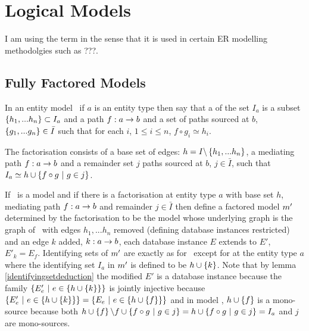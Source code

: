 \section{Logical Models}
I am using the term  in the sense that it is used in certain ER modelling methodolgies such as ???.
\subsection{Fully Factored Models}

\begin{definition}
In an entity model \genericmodel\ if $a$ is an entity type then say that
a  of the set $I_a$ is a subset $\left\{h_1,...h_n\right\} \subset I_a$
and a  path $f:a \rightarrow b$ and a set of paths sourced at $b$, $\left\{g_1,...g_n\right\} \in \bar{I}$
such that for each $i$, $1 \leq i \leq n$, $f \circ g_i \simeq h_i$. 
\end{definition}

The factorisation consists  
of a base set of edges: $h=I \backslash \left\{h_1,...h_n\right\}$, a mediating path $f:a \rightarrow b$ and a remainder 
set $j$ paths sourced at $b$, $j \in \bar{I}$, 
such that $I_a \simeq h \cup \left\{f\circ g \ \middle|\ g \in j\right\}$.

\begin{definition}
If \genericmodel\ is a model and if there is a factorisation at entity type $a$ with
base set $h$, mediating path $f: a \rightarrow b$ and remainder $j \in \bar{I}$ then define
a factored model ${m}'$ determined by the factorisation to be the model
whose underlying graph is the graph of \genericmodel\ with edges $h_1,...h_n$ removed 
(defining database instances restricted) and
an edge $k$ added, $k:a \rightarrow b$, each database instance $E$ extends to $E'$, $E'_k = E_f$.
Identifying sets of ${m}'$ are exactly as for \genericmodel\ except for at the entity
type $a$ where the identifying set $I_a$ in ${m}'$ is defined to be $h \cup \left\{k\right\}$.
Note that by lemma \ref{identifyingsetdeduction} the modified $E'$ is a database instance because
the family 
$\left\{E'_e \ \middle|\ e \in \left\{h \cup \left\{k\right\}\right\}\right\}$ is jointly injective because 
$\left\{E'_e \ \middle|\ e \in \left\{h \cup \left\{k\right\}\right\}\right\} =\left\{E_e \ \middle|\ e \in \left\{h \cup \left\{f\right\}\right\}\right\}$
and in model \genericmodel, $h \cup \left\{f\right\}$ is a mono-source because both
$h \cup \left\{f\right\} \backslash f \cup \left\{f \circ g \ \middle|\ g \in j\right\}
=h  \cup \left\{f \circ g \ \middle|\ g \in j\right\}=I_a$ and $j$ are  mono-sources.


\end{definition}

